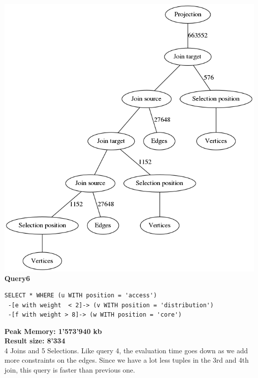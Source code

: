 \documentclass[11pt,singlecolumn]{scrartcl}
\begin{document}
\includegraphics[width=1\textwidth]{graph5}
\clearpage
\textbf{Query6}\\
\begin{verbatim}
SELECT * WHERE (u WITH position = 'access')
 -[e with weight  < 2]-> (v WITH position = 'distribution')
 -[f with weight > 8]-> (w WITH position = 'core')\end{verbatim}
\textbf{Peak Memory: 1'573'940 kb}\\
\textbf{Result size: 8'334}\\
4 Joins and 5 Selections. Like query 4, the evaluation time goes down as we add more constraints on the edges. Since we have a lot less tuples in the 3rd and 4th join, this query is faster than previous one.
\clearpage
\end{document}
